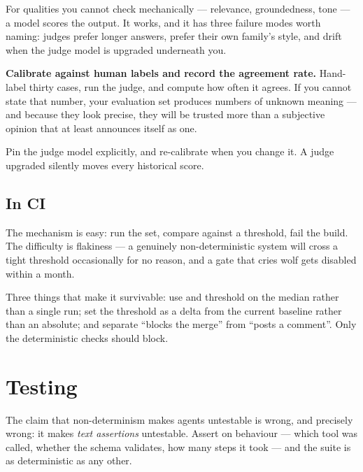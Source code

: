 For qualities you cannot check mechanically --- relevance, groundedness, tone ---
a model scores the output. It works, and it has three failure modes worth naming:
judges prefer longer answers, prefer their own family's style, and drift when the
judge model is upgraded underneath you.

\begin{warning}
\textbf{Calibrate against human labels and record the agreement rate.} Hand-label
thirty cases, run the judge, and compute how often it agrees. If you cannot state
that number, your evaluation set produces numbers of unknown meaning --- and
because they look precise, they will be trusted more than a subjective opinion
that at least announces itself as one.

Pin the judge model explicitly, and re-calibrate when you change it. A judge
upgraded silently moves every historical score.
\end{warning}

\subsection{In CI}
\label{sec:eval-ci}

The mechanism is easy: run the set, compare against a threshold, fail the build.
The difficulty is flakiness --- a genuinely non-deterministic system will cross a
tight threshold occasionally for no reason, and a gate that cries wolf gets
disabled within a month.

Three things that make it survivable: use  and threshold
on the median rather than a single run; set the threshold as a delta from the
current baseline rather than an absolute; and separate ``blocks the merge'' from
``posts a comment''. Only the deterministic checks should block.

\section{Testing}
\label{sec:testing}


The claim that non-determinism makes agents untestable is wrong, and precisely
wrong: it makes \emph{text assertions} untestable. Assert on behaviour --- which
tool was called, whether the schema validates, how many steps it took --- and the
suite is as deterministic as any other.

